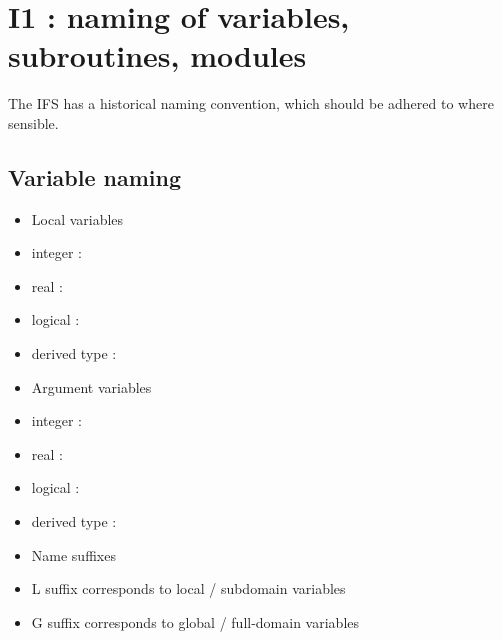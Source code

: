 \documentclass[letterpaper,10pt,english]{sphinxmanual}
\begin{document}
\section{I1 : naming of variables, subroutines, modules}
\label{\detokenize{rules/I1:i1-naming-of-variables-subroutines-modules}}\label{\detokenize{rules/I1::doc}}
The IFS has a historical naming convention, which should be adhered to
where sensible.


\subsection{Variable naming}
\label{\detokenize{rules/I1:variable-naming}}\begin{itemize}
\item {} 
Local variables

\end{itemize}
\begin{itemize}
\item {} 
integer : 

\item {} 
real : 

\item {} 
logical : 

\item {} 
derived type : 

\end{itemize}
\begin{itemize}
\item {} 
Argument variables

\end{itemize}
\begin{itemize}
\item {} 
integer : 

\item {} 
real : 

\item {} 
logical : 

\item {} 
derived type : 

\end{itemize}
\begin{itemize}
\item {} 
Name suffixes

\end{itemize}
\begin{itemize}
\item {} 
L suffix corresponds to local / subdomain variables

\item {} 
G suffix corresponds to global / full-domain variables

\end{itemize}
\end{document}
